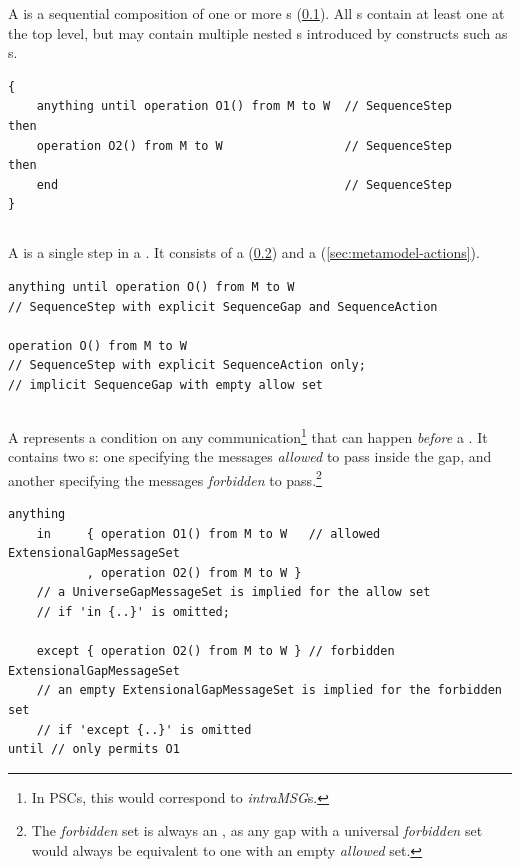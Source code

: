 A \msubsequence{} is a sequential composition of one or more \msequencestep s
(\cref{ssec:metamodel-sequences-steps}).
All \msequence s contain at least one \msubsequence{} at the top level, but
may contain multiple nested \msubsequence s introduced by constructs such as
\mloopaction s.

\begin{lstlisting}[style=Example]
{
    anything until operation O1() from M to W  // SequenceStep
then
    operation O2() from M to W                 // SequenceStep
then
    end                                        // SequenceStep
}
\end{lstlisting}

\subsection{\msequencestep}\label{ssec:metamodel-sequences-steps}

A \msequencestep{} is a single step in a \msubsequence.  It consists of a
\msequencegap{} (\cref{ssec:metamodel-sequences-gaps}) and a
\msequenceaction{} (\cref{sec:metamodel-actions}).

\begin{lstlisting}[style=Example]
anything until operation O() from M to W
// SequenceStep with explicit SequenceGap and SequenceAction

operation O() from M to W
// SequenceStep with explicit SequenceAction only;
// implicit SequenceGap with empty allow set
\end{lstlisting}

\subsection{\msequencegap}\label{ssec:metamodel-sequences-gaps}

A \msequencegap{} represents a condition on any communication\footnote{In PSCs,
this would correspond to \emph{intraMSG}s.} that can happen
\emph{before} a \msequenceaction.  
It contains two \mgapmessageset s: one specifying the messages
\emph{allowed} to pass inside the gap, and another specifying the messages
\emph{forbidden} to pass.\footnote{The \emph{forbidden} set is always an
\mextensionalgapmessageset, as any gap with a universal
\emph{forbidden} set would always be equivalent to one with an empty
\emph{allowed} set.
}

\begin{lstlisting}[style=Example]
anything
    in     { operation O1() from M to W   // allowed ExtensionalGapMessageSet
           , operation O2() from M to W }
    // a UniverseGapMessageSet is implied for the allow set
    // if 'in {..}' is omitted;

    except { operation O2() from M to W } // forbidden ExtensionalGapMessageSet
    // an empty ExtensionalGapMessageSet is implied for the forbidden set
    // if 'except {..}' is omitted
until // only permits O1
\end{lstlisting}

